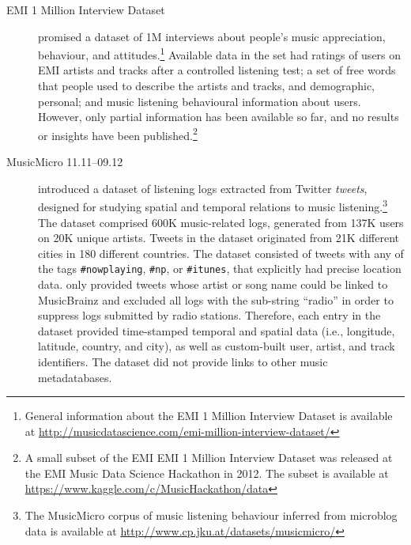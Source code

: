 \begin{description}
\item [EMI 1 Million Interview Dataset] \textcite{emi12million} promised a dataset of 1M interviews about people's music appreciation, behaviour, and attitudes.\footnote{General information about the EMI 1 Million Interview Dataset is available at \url{http://musicdatascience.com/emi-million-interview-dataset/}} Available data in the set had ratings of users on EMI artists and tracks after a controlled listening test; a set of free words that people used to describe the artists and tracks, and demographic, personal; and music listening behavioural information about users. However, only partial information has been available so far, and no results or insights have been published.\footnote{A small subset of the EMI  EMI 1 Million Interview Dataset was released at the EMI Music Data Science Hackathon in 2012. The subset is available at \url{https://www.kaggle.com/c/MusicHackathon/data}}

\item [MusicMicro 11.11--09.12] \textcite{schedl13leveraging} introduced a dataset of listening logs extracted from Twitter \emph{tweets}, designed for studying spatial and temporal relations to music listening.\footnote{The MusicMicro corpus of music listening behaviour inferred from microblog data is available at \url{http://www.cp.jku.at/datasets/musicmicro/}} The dataset comprised 600K music-related logs, generated from 137K users on 20K unique artists. Tweets in the dataset originated from 21K different cities in 180 different countries.
The dataset consisted of tweets with any of the tags \texttt{\#nowplaying}, \texttt{\#np}, or \texttt{\#itunes}, that explicitly had precise location data. \citeauthor{schedl13leveraging} only provided tweets whose artist or song name could be linked to MusicBrainz and excluded all logs with the sub-string ``radio'' in order to suppress logs submitted by radio stations.
Therefore, each entry in the dataset provided time-stamped temporal and spatial data (i.e., longitude, latitude, country, and city), as well as custom-built user, artist, and track identifiers. The dataset did not provide links to other music metadatabases.



\end{description}
